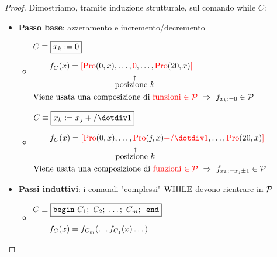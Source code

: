 \begin{proof}
	Dimostriamo, tramite induzione strutturale, sul comando while $C$:
	\begin{itemize}
		\item \textbf{Passo base}: azzeramento e incremento/decremento
		\begin{itemize}
			\renewcommand{\labelitemii}{\raisebox{5.2\height}{$-$}}
			\item $\begin{aligned}
				&C\equiv \boxed{x_k:=0} \\[.6em]
				&\hspace{2em}f_C(x) = {\color{red}[}
				{\color{red}\pro}(0,x),\dots,{\color{red}0},\dots,{\color{red}\pro}
				(20,x){\color{red}]}\\
				&\hspace{10.05em}\overset{\uparrow}{\text{posizione $k$}}\\
				& \text{Viene usata una composizione di {\color{red}funzioni 
						$\in\cp$}}
				\ \Rightarrow \ f_{x_k:=0}\in\cp
			\end{aligned}$
			\renewcommand{\labelitemii}{\raisebox{5.2\height}{$-$}}
			\item $\begin{aligned}
				&C\equiv \boxed{x_k:=x_j+/\dotminus 1}\\[.6em]
				&\hspace{2em}f_C(x) = {\color{red}[}
				{\color{red}\pro}(0,x),\dots,
				{\color{red}\pro}(j,x){\color{red}+/\dotminus 1}
				,\dots,{\color{red}\pro}
				(20,x){\color{red}]}\\
				&\hspace{10.05em}\overset{\uparrow}{\text{posizione $k$}}\\
				& \text{Viene usata una composizione di {\color{red}funzioni 
						$\in\cp$}}
				\ \Rightarrow \ f_{x_k:=x_j\pm1}\in\cp
			\end{aligned}$
		\end{itemize}
		\item \textbf{Passi induttivi}: i comandi "complessi" $\text{WHILE}$ devono rientrare in $\mathcal{P}$
		\begin{itemize}
			\renewcommand{\labelitemii}{\raisebox{2.1\height}{$-$}}
			\item $\begin{aligned}
				&C\equiv \boxed{
					\text{\texttt{begin} } C_ 1; \ C_2; \ \dots; \ C_m; \text{\texttt{ end}}
				}\\[.6em]
				&\hspace{2em}f_C(x) = f_{C_m}(\dots f_{C_1}(x)\dots)\\
			\end{aligned}$
			\vspace{.7em}
			

\end{itemize}
\end{itemize}
\end{proof}
